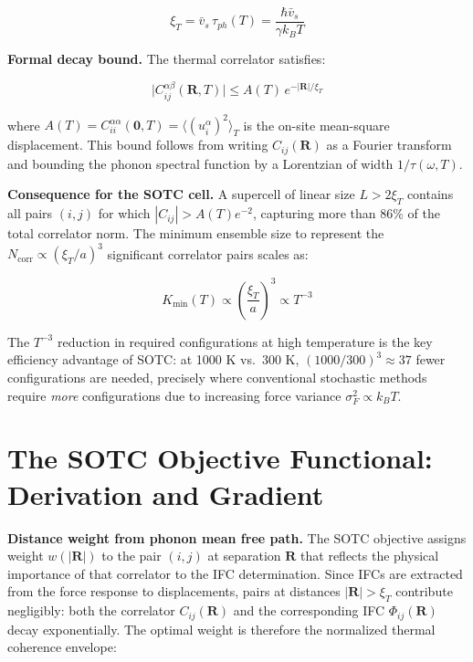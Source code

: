 \documentclass[aps,prb,reprint,amsmath,amssymb,floatfix]{revtex4-2}
\begin{document}
\begin{equation*}
\xi_T = \bar{v}_s\,\tau_{ph}(T) = \frac{\hbar\bar{v}_s}{\gamma k_BT}
\end{equation*}

\textbf{Formal decay bound.} The thermal correlator satisfies:

\begin{equation*}
\bigl|C_{ij}^{\alpha\beta}(\mathbf{R},T)\bigr| \leq A(T)\,e^{-|\mathbf{R}|/\xi_T}
\end{equation*}

where
\(A(T) = C_{ii}^{\alpha\alpha}(\mathbf{0},T) = \langle(u_i^\alpha)^2\rangle_T\)
is the on-site mean-square displacement. This bound follows from writing
\(C_{ij}(\mathbf{R})\) as a Fourier transform and bounding the phonon
spectral function by a Lorentzian of width \(1/\tau(\omega,T)\).

\textbf{Consequence for the SOTC cell.} A supercell of linear size
\(L > 2\xi_T\) contains all pairs \((i,j)\) for which
\(|C_{ij}| > A(T)e^{-2}\), capturing more than 86\% of the total
correlator norm. The minimum ensemble size to represent the
\(N_\text{corr} \propto (\xi_T/a)^3\) significant correlator pairs
scales as:

\begin{equation*}
K_\text{min}(T) \propto \left(\frac{\xi_T}{a}\right)^3 \propto T^{-3}
\end{equation*}

The \(T^{-3}\) reduction in required configurations at high temperature
is the key efficiency advantage of SOTC: at 1000 K vs.~300 K,
\((1000/300)^3 \approx 37\) fewer configurations are needed, precisely
where conventional stochastic methods require \emph{more} configurations
due to increasing force variance \(\sigma_F^2 \propto k_BT\).


\section{The SOTC Objective Functional: Derivation and
Gradient}\label{appendix-c-the-sotc-objective-functional-derivation-and-gradient}

\textbf{Distance weight from phonon mean free path.} The SOTC objective
assigns weight \(w(|\mathbf{R}|)\) to the pair \((i,j)\) at separation
\(\mathbf{R}\) that reflects the physical importance of that correlator
to the IFC determination. Since IFCs are extracted from the force
response to displacements, pairs at distances \(|\mathbf{R}| > \xi_T\)
contribute negligibly: both the correlator \(C_{ij}(\mathbf{R})\) and
the corresponding IFC \(\Phi_{ij}(\mathbf{R})\) decay exponentially. The
optimal weight is therefore the normalized thermal coherence envelope:
\end{document}
